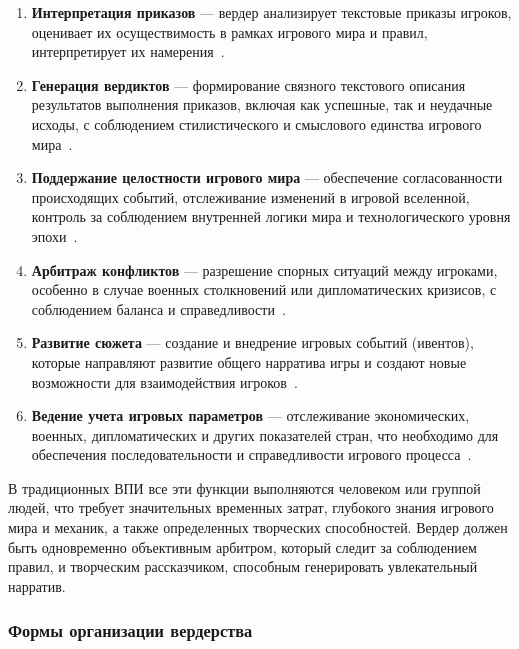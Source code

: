\begin{enumerate}
    \item \textbf{Интерпретация приказов} — вердер анализирует текстовые приказы игроков, оценивает их осуществимость в рамках игрового мира и правил, интерпретирует их намерения~\cite{rpg-gamemaster}.

    \item \textbf{Генерация вердиктов} — формирование связного текстового описания результатов выполнения приказов, включая как успешные, так и неудачные исходы, с соблюдением стилистического и смыслового единства игрового мира~\cite{wpg-glossary}.

    \item \textbf{Поддержание целостности игрового мира} — обеспечение согласованности происходящих событий, отслеживание изменений в игровой вселенной, контроль за соблюдением внутренней логики мира и технологического уровня эпохи~\cite{dtf-wpg-article}.

    \item \textbf{Арбитраж конфликтов} — разрешение спорных ситуаций между игроками, особенно в случае военных столкновений или дипломатических кризисов, с соблюдением баланса и справедливости~\cite{rpg-gamemaster}.

    \item \textbf{Развитие сюжета} — создание и внедрение игровых событий (ивентов), которые направляют развитие общего нарратива игры и создают новые возможности для взаимодействия игроков~\cite{narratology-games}.

    \item \textbf{Ведение учета игровых параметров} — отслеживание экономических, военных, дипломатических и других показателей стран, что необходимо для обеспечения последовательности и справедливости игрового процесса~\cite{wpg-dtf}.
\end{enumerate}

В традиционных ВПИ все эти функции выполняются человеком или группой людей, что требует значительных временных затрат, глубокого знания игрового мира и механик, а также определенных творческих способностей. Вердер должен быть одновременно объективным арбитром, который следит за соблюдением правил, и творческим рассказчиком, способным генерировать увлекательный нарратив.

\subsubsection{Формы организации вердерства}

